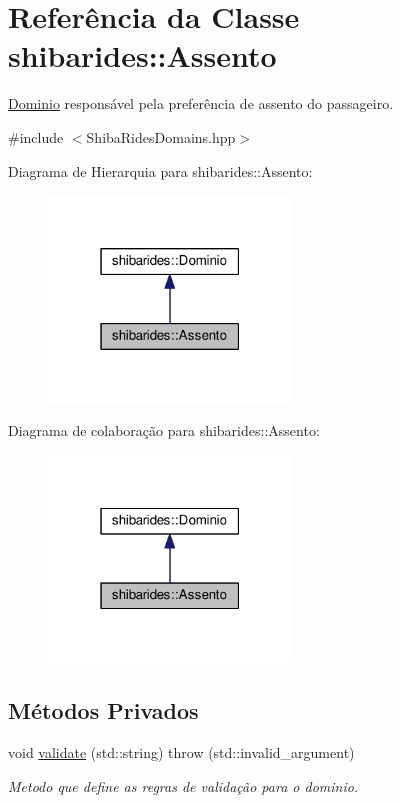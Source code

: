 \hypertarget{classshibarides_1_1Assento}{}\section{Referência da Classe shibarides\+:\+:Assento}
\label{classshibarides_1_1Assento}


\hyperlink{classshibarides_1_1Dominio}{Dominio} responsável pela preferência de assento do passageiro.  




{\ttfamily \#include $<$Shiba\+Rides\+Domains.\+hpp$>$}



Diagrama de Hierarquia para shibarides\+:\+:Assento\+:\nopagebreak
\begin{figure}[H]
\begin{center}
\leavevmode
\includegraphics[width=183pt]{classshibarides_1_1Assento__inherit__graph}
\end{center}
\end{figure}


Diagrama de colaboração para shibarides\+:\+:Assento\+:\nopagebreak
\begin{figure}[H]
\begin{center}
\leavevmode
\includegraphics[width=183pt]{classshibarides_1_1Assento__coll__graph}
\end{center}
\end{figure}
\subsection*{Métodos Privados}
\begin{DoxyCompactItemize}
\item 
void \hyperlink{classshibarides_1_1Assento_a8a2099562808c49caff59569bcb977c3}{validate} (std\+::string)  throw (std\+::invalid\+\_\+argument)
\begin{DoxyCompactList}\small\item\em Metodo que define as regras de validação para o dominio. \end{DoxyCompactList}\end{DoxyCompactItemize}
